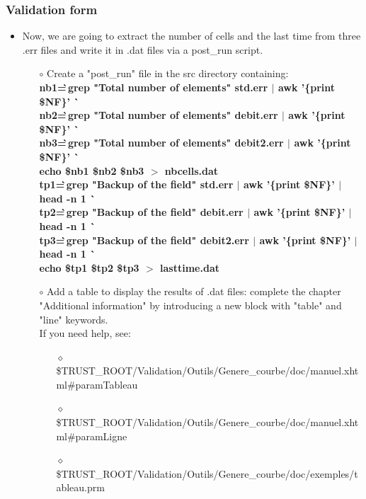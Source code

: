 \documentclass[10pt, hyperref={unicode=true,pdfusetitle, bookmarks=true,bookmarksnumbered=false,bookmarksopen=false, breaklinks=false,pdfborder={0 0 1},backref=true,colorlinks=true,linkcolor=darkblue,pageanchor}]{beamer}
\begin{document}
\begin{frame}
\frametitle{Validation form}
\begin{block}{}

\begin{itemize}
\item Now, we are going to extract the number of cells and the last time from three .err files and write it in .dat files via a post\_run script.

    \begin{itemize}
    \item [$\circ$] Create a "post\_run" file in the src directory containing:\\
    {\footnotesize{
    \textbf{nb1=\` \,grep "Total number of elements" std.err $|$ awk '\{print \$NF\}' \`} \\
    \textbf{nb2=\` \,grep "Total number of elements" debit.err $|$ awk '\{print \$NF\}' \`} \\
    \textbf{nb3=\` \,grep "Total number of elements" debit2.err $|$ awk '\{print \$NF\}' \`} \\
    \textbf{echo \$nb1 \$nb2 \$nb3 $>$ nbcells.dat} \\
    \textbf{tp1=\` \,grep "Backup of the field" std.err $|$ awk '\{print \$NF\}' $|$ head -n 1 \`} \\
    \textbf{tp2=\` \,grep "Backup of the field" debit.err $|$ awk '\{print \$NF\}' $|$ head -n 1 \`} \\
    \textbf{tp3=\` \,grep "Backup of the field" debit2.err $|$ awk '\{print \$NF\}' $|$ head -n 1 \`} \\
    \textbf{echo \$tp1 \$tp2 \$tp3 $>$ lasttime.dat} \\
    }}

    \item [$\circ$] Add a table to display the results of .dat files: complete the chapter "Additional information" by introducing a new block with "table" and "line" keywords.\\
    If you need help, see:
        \begin{itemize}
        \item [$\diamond$] {\scriptsize{\$TRUST\_ROOT/Validation/Outils/Genere\_courbe/doc/manuel.xhtml\#paramTableau}}
        \item [$\diamond$] {\scriptsize{\$TRUST\_ROOT/Validation/Outils/Genere\_courbe/doc/manuel.xhtml\#paramLigne}}
        \item [$\diamond$] {\scriptsize{\$TRUST\_ROOT/Validation/Outils/Genere\_courbe/doc/exemples/tableau.prm}}
        \end{itemize}
    \end{itemize}
\end{itemize}

\end{block}
\end{frame}
\end{document}
